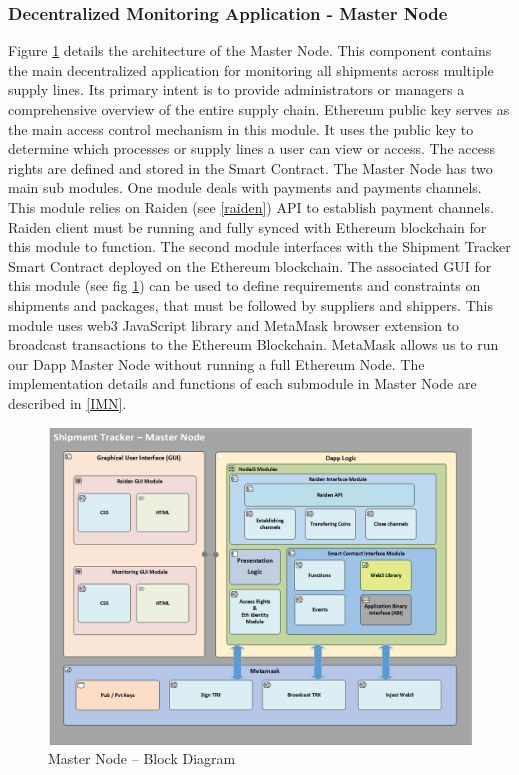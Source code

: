 \subsubsection{Decentralized Monitoring Application - Master Node} \label{MasterNode} 
Figure \ref{fig:ArchitectureMN} details the architecture of the Master Node. This component contains the main decentralized application for monitoring all shipments across multiple supply lines. Its primary intent is to provide administrators or managers a comprehensive overview of the entire supply chain. Ethereum public key serves as the main access control mechanism in this module. It uses the public key to determine which processes or supply lines a user can view or access. The access rights are defined and stored in the Smart Contract. The Master Node has two main sub modules. One module deals with payments and payments channels. This module relies on Raiden (see \ref{raiden}) API to establish payment channels. Raiden client must be running and fully synced with Ethereum blockchain for this module to function. The second module interfaces with the Shipment Tracker Smart Contract deployed on the Ethereum blockchain. The associated GUI for this module (see fig \ref{fig:ArchitectureMN}) can be used to define requirements and constraints on shipments and packages, that must be followed by suppliers and shippers. This module uses web3 JavaScript library and MetaMask browser extension to broadcast transactions to the Ethereum Blockchain. MetaMask allows us to run our Dapp Master Node without running a full Ethereum Node. The implementation details and functions of each submodule in Master Node are described in \ref{IMN}. 

\begin{figure}[h]
	\centering
    \includegraphics[width=160mm,scale=1]{figs/MasterNode-BD}
	\caption{Master Node – Block Diagram}
	\label{fig:ArchitectureMN} 
\end{figure}
\clearpage
